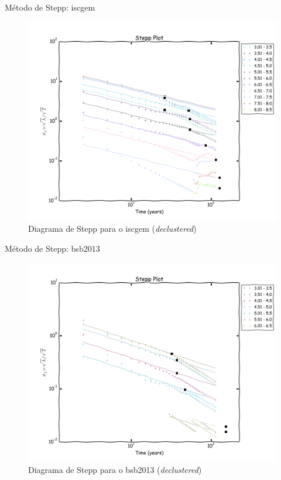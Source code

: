 \documentclass[ucs,8pt]{beamer}
\begin{document}
\begin{frame}{Método de Stepp: \gls{iscgem}}
\begin{figure}[H]
	\centering
	\includegraphics[height=0.90\textheight]{stepp_sa}
	\caption{Diagrama de Stepp para o \gls{iscgem} (\emph{declustered})}
	\label{fig:sa_stepp}
\end{figure}
\end{frame}


\begin{frame}{Método de Stepp: \gls{bsb2013}}
\begin{figure}[H]
	\centering
	\includegraphics[height=0.90\textheight]{stepp_br}
	\caption{Diagrama de Stepp para o \gls{bsb2013} (\emph{declustered})}
	\label{fig:br_stepp}
\end{figure}
\end{frame}
\end{document}
